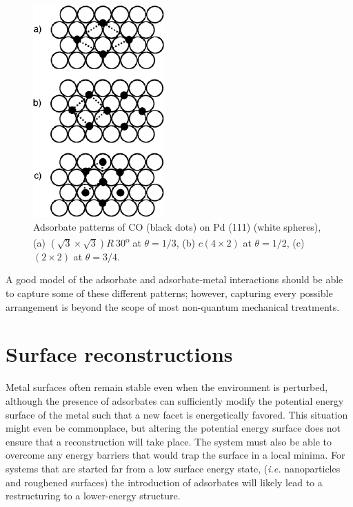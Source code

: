 \begin{figure}[p!]
\centering
  \includegraphics[width=0.5\linewidth]{../figures/chap1/pattern.pdf}
  \caption{Adsorbate patterns of CO (black dots) on Pd (111) (white spheres), (a)
$(\sqrt{3}\times\sqrt{3})R\ 30$\textsuperscript{o} at $\theta=1/3$, (b) $c(4\times2)$ at $\theta=1/2$, (c) $(2\times2)$ at $\theta=3/4$.}
\label{fig:patterns}
\end{figure}

A good model of the adsorbate and adsorbate-metal interactions should be able
to capture some of these different patterns; however, capturing every possible
arrangement is beyond the scope of most non-quantum mechanical treatments.

\section{Surface reconstructions}

Metal surfaces often remain stable even when the environment is perturbed,
although the presence of adsorbates can sufficiently modify the potential
energy surface of the metal such that a new facet is energetically favored.
This situation might even be commonplace, but altering the potential energy
surface does not ensure that a reconstruction will take place. The system must
also be able to overcome any energy barriers that would trap the surface in a
local minima.  For systems that are started far from a low surface energy
state, ({\em i.e.} nanoparticles and roughened surfaces) the introduction of
adsorbates will likely lead to a restructuring to a lower-energy structure. 

